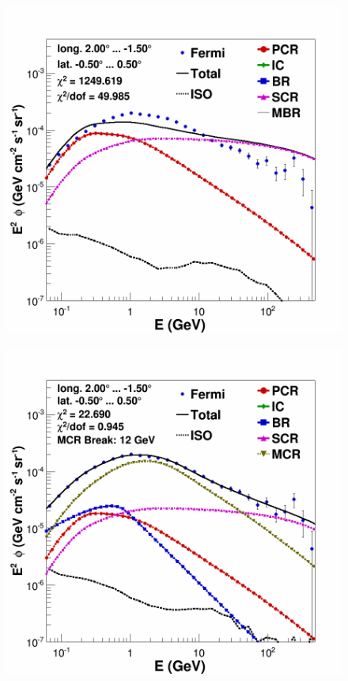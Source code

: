 \begin{figure}[h]
  \centering
  \begin{minipage}[h]{0.45\textwidth}
	  \centering
	  \includegraphics[width=\linewidth]{pic/results/SCRonly_CMZ.png}	  
	  \label{fig:SCRonly_CMZ}
  \end{minipage}
  \hfill
  \begin{minipage}[h]{0.45\textwidth}
	  \centering
	  \includegraphics[width=\linewidth]{pic/results/MCRonly_CMZ.png}
  	  \label{fig:MCRonly_CMZ}
  \end{minipage}
  \caption{}
  \label{fig:MCR_vs_SCRonly_CMZ}
\end{figure}

